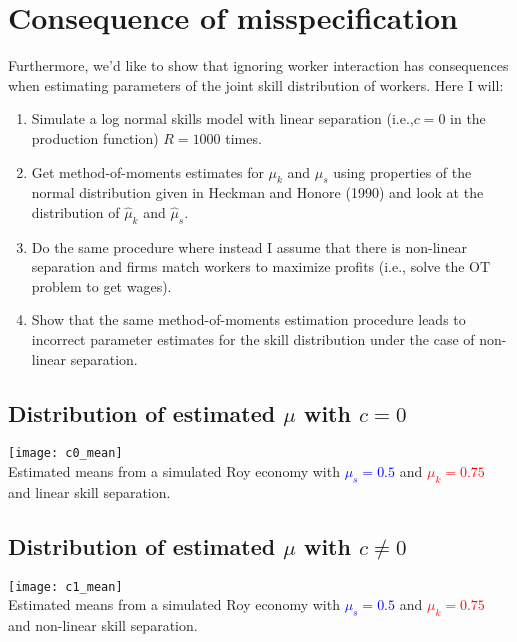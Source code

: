 \documentclass{article}
\title{}
\author{}
\date{}
\begin{document}
	\section*{Consequence of misspecification}
	Furthermore, we'd like to show that ignoring worker interaction has consequences when estimating parameters of the joint skill distribution of workers. Here I will:
	\bigskip
	
	\begin{enumerate}
		\item Simulate a log normal skills model with linear separation (i.e.,$c=0$ in the production function) $R=1000$ times.
		\bigskip
		\item Get method-of-moments estimates for $\mu_k$ and $\mu_s$ using properties of the normal distribution given in Heckman and Honore (1990) and look at the distribution of $\hat{\mu}_k$ and $\hat{\mu}_s$.
		\bigskip
		\item Do the same procedure where instead I assume that there is non-linear separation and firms match workers to maximize profits (i.e., solve the OT problem to get wages).
		\bigskip
		\item Show that the same method-of-moments estimation procedure leads to incorrect parameter estimates for the skill distribution under the case of non-linear separation. 
	\end{enumerate}


\subsection*{Distribution of estimated $\mu$ with $c=0$}
	\begin{center}
		\texttt{[image: c0\_mean]}\\
		
		Estimated means from a simulated Roy economy with \textcolor{blue}{$\mu_s = 0.5$} and \textcolor{red}{$\mu_k = 0.75$} and linear skill separation.
	\end{center}

\subsection*{Distribution of estimated $\mu$ with $c\neq 0$}
	\begin{center}
		\texttt{[image: c1\_mean]}\\
		
		Estimated means from a simulated Roy economy with \textcolor{blue}{$\mu_s = 0.5$} and \textcolor{red}{$\mu_k = 0.75$} and non-linear skill separation. 
	\end{center}
\end{document}
